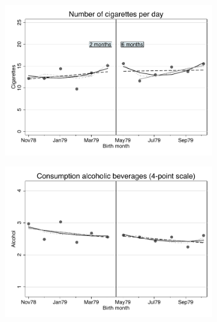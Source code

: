 \documentclass[a4paper ]{article}
\begin{document}
\begin{figure}[p]
\begin{subfigure}[h]{0.48\textwidth}\centering
	\includegraphics[width=\textwidth]{../../analysis/graphs/SOEP/Cigarettes_RD.pdf}
\end{subfigure}
\quad
\begin{subfigure}[h]{0.48\textwidth}\centering
	\includegraphics[width=\textwidth]{../../analysis/graphs/SOEP/Alcohol_RD.pdf}
\end{subfigure}




\end{figure}
\end{document}
